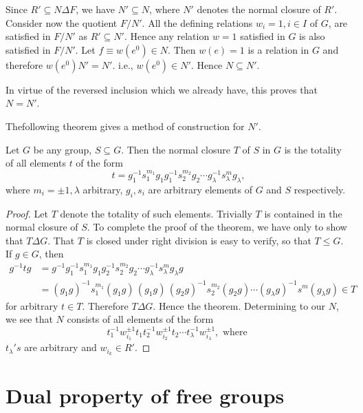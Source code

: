 Since $R' \subseteq N \Delta F$, we have $N' \subseteq N$, where $N'$
denotes the normal closure of $R'$. Consider now the quotient
$F/N'$. All the defining relations $w_i=1,i \in I$ of $G$, are
satisfied in $F/N'$ as $R' \subseteq N'$. Hence any relation $w=1$
satisfied in $G$ is also satisfied in $F/N'$. Let $f \equiv w(e^0)\in
N$. Then $w(e)=1$ is a relation in $G$ and therefore
$w(e^0)N'=N'$. i.e., $w(e^0)\in N'$. Hence $N \subseteq N'$.  

In virtue of the reversed inclusion which we already have, this proves
that $N=N'$. 

The\pageoriginale following theorem gives a method of construction for $N'$.

\begin{theorem}\label{chap4:sec3:thm4}%
  Let $G$ be any group, $S \subseteq G$. Then the normal closure $T$ of
  $S$ in $G$ is the totality of all elements $t$ of the form 
  $$
  t=g^{-1}_1 s^{m_1}_1 g_1 g^{-1}_1 s_2^{m_2}g_2 \cdots g^{-1}_
  \lambda s_ \lambda^m g_ \lambda,
  $$
  where $m_i=\pm1, \lambda$ arbitrary, $g_i,s_i$ are arbitrary
  elements of $G$ and $S$ respectively. 
\end{theorem}

\begin{proof}
  Let $T$ denote the totality of such elements. Trivially $T$ is
  contained in the normal closure of $S$. To complete the proof of the
  theorem, we have only to show that $T \Delta G$. That $T$ is closed
  under right division is easy to verify, so that $T \leq G$. If $g
  \in G$, then  
  \begin{align*}
    g^{-1}tg &=g^{-1} g^{-1}_1 s_1^{m_1} g_1 g_2^{-1} s_2^{m_2} g_2 \cdots g^{-1}_
    \lambda s_\lambda^m g_\lambda g\\ 
    &= (g_1 g)^{-1} s^{m_1}_1 (g_1 g) \,(g_1
    g)\, (g_2 g)^{-1} s_2^{m_2} (g_2 g)\cdots (g_\lambda g)^{-1} s^{m} 
    (g_\lambda g) \in T 
  \end{align*}
  for arbitrary  $t \in T$. Therefore $T \Delta G$. Hence the theorem.
  Determining to our $N$, we see that $N$ consists of all elements of
  the form 
  $$
  t^{-1}_1 w^{\pm 1}_{i_1}t_1t_2^{-1}w^{\pm 1}_{i_2} t_2 \cdots t_
  \lambda^{-1}w^{\pm 1}_{i_\lambda}, \text{ where } 
  $$
  $t_ \lambda 's$ are arbitrary and $w_{i_k}\in R'$.
\end{proof}

\section{Dual property of free groups}\label{chap4:sec4} %

